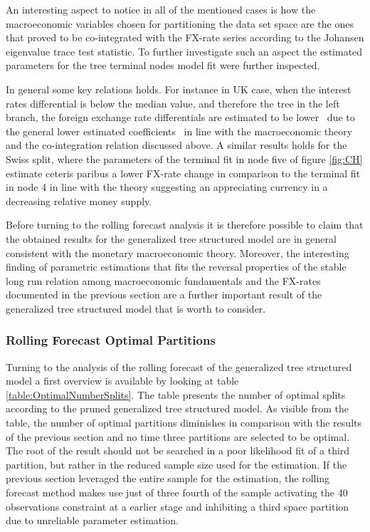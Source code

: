 An interesting aspect to notice in all of the mentioned cases is how
the macroeconomic variables chosen for partitioning the data set space
are the ones that proved to be co-integrated with the FX-rate series
according to the Johansen eigenvalue trace test statistic. To further
investigate such an aspect the estimated parameters for the tree
terminal nodes model fit were further inspected.

In general some key relations holds. For instance in UK case, when the
interest rates differential is below the median value, and therefore
the tree in the left branch, the foreign exchange rate differentials
are estimated to be lower \textendash \ due to the
general lower estimated coefficients \textendash \ in line with the
macroeconomic theory and the co-integration relation discussed
above. A similar results holds for the Swiss split, where the
parameters of the terminal fit in node five of figure \ref{fig:CH}
estimate ceteris paribus a lower FX-rate change in comparison to the
terminal fit in node 4 in line with the theory suggesting an
appreciating currency in a decreasing relative money supply.

Before turning to the rolling forecast analysis it is therefore
possible to claim that the obtained results for the generalized tree
structured model are in general consistent with the monetary
macroeconomic theory. Moreover, the interesting finding of parametric
estimations that fits the reversal properties of the stable long run
relation among macroeconomic fundamentals and the FX-rates documented
in the previous section are a further important result of the
generalized tree structured model that is worth to consider.

\subsubsection{Rolling Forecast Optimal Partitions}

Turning to the analysis of the rolling forecast of the generalized
tree structured model a first overview is available by looking at
table \ref{table:OptimalNumberSplits}. The table presents the number
of optimal splits according to the pruned generalized tree structured
model. As visible from the table, the number of optimal partitions
diminishes in comparison with the results of the previous section and
no time three partitions are selected to be optimal.  The root of
the result should not be searched in a poor likelihood fit of a third
partition, but rather in the reduced sample size used for the
estimation. If the previous section leveraged the entire sample for
the estimation, the rolling forecast method makes use just of three
fourth of the sample activating the 40 observations constraint at a
earlier stage and inhibiting a third space partition due to unreliable
parameter estimation.

